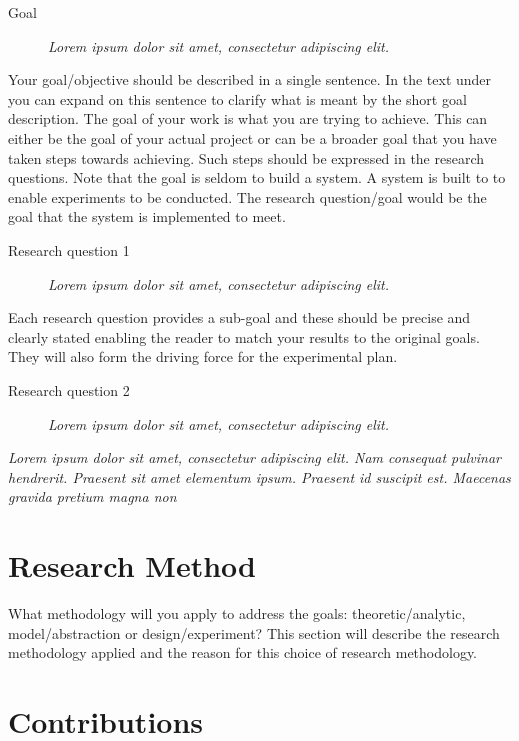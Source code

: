 \documentclass[a4paper]{book}
\begin{document}
\begin{description}
\item[Goal] {\it Lorem ipsum dolor sit amet, consectetur adipiscing elit.}
\end{description}

Your goal/objective should be described in a single sentence. In the text under you can expand on this sentence to clarify what is meant by the short goal description. 
The goal of your work is what you are trying to achieve. This can either be the goal of your actual project or can be a broader goal that you have taken steps towards achieving. Such steps should be expressed in the research questions. 
Note that the goal is seldom to build a system. A system is built to to enable experiments to be conducted. The research question/goal would be the goal that the system is implemented to meet.  


\begin{description}
\item[Research question 1] {\it Lorem ipsum dolor sit amet, consectetur adipiscing elit.}
\end{description}

Each research question provides a sub-goal and these should be precise and clearly stated enabling the reader to match your results to the original goals. They will also form the driving force for the experimental plan. 

\begin{description}
\item[Research question 2] {\it Lorem ipsum dolor sit amet, consectetur adipiscing elit.}
\end{description}

{\it Lorem ipsum dolor sit amet, consectetur adipiscing elit. Nam consequat pulvinar hendrerit. Praesent sit amet elementum ipsum. Praesent id suscipit est. Maecenas gravida pretium magna non }

\section{Research Method}
\label{sec:researchMethod}

What methodology will you apply to address the goals: theoretic/analytic, model/abstraction or design/experiment? This section will describe the research methodology applied and the reason for this choice of research methodology.  

\section{Contributions}
\label{sec:IntroContributions}
\end{document}
